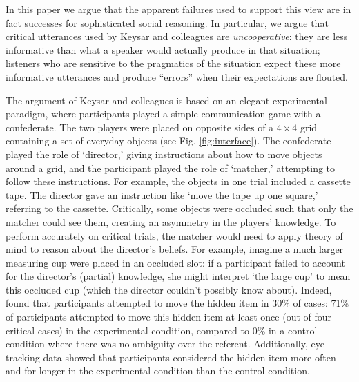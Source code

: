 \documentclass[10pt,letterpaper]{article}
\begin{document}
In this paper we argue that the apparent failures used to support this view are in fact successes for sophisticated social reasoning. In particular, we argue that critical utterances used by Keysar and colleagues are \emph{uncooperative}: they are less informative than what a speaker would actually produce in that situation; listeners who are sensitive to the pragmatics of the situation expect these more informative utterances and produce ``errors'' when their expectations are flouted. 

The argument of Keysar and colleagues is based on an elegant experimental paradigm, where participants played a simple communication game with a confederate. The two players were placed on opposite sides of a $4 \times 4$ grid containing a set of everyday objects (see Fig. \ref{fig:interface}). The confederate played the role of `director,' giving instructions about how to move objects around a grid, and the participant played the role of `matcher,' attempting to follow these instructions. For example, the objects in one trial included a cassette tape. The director gave an instruction like `move the tape up one square,' referring to the cassette.
Critically, some objects were occluded such that only the matcher could see them, creating an asymmetry in the players' knowledge. To perform accurately on critical trials, the matcher would need to apply theory of mind to reason about the director's beliefs. For example, imagine a much larger measuring cup were placed in an occluded slot: if a participant failed to account for the director's (partial) knowledge, she might interpret `the large cup' to mean this occluded cup (which the director couldn't possibly know about). 
Indeed,  found that participants attempted to move the hidden item in 30\% of cases: 71\% of participants attempted to move this hidden item at least once (out of four critical cases) in the experimental condition, compared to 0\% in a control condition where there was no ambiguity over the referent. 
Additionally, eye-tracking data showed that participants considered the hidden item more often and for longer in the experimental condition than the control condition. 
\end{document}
